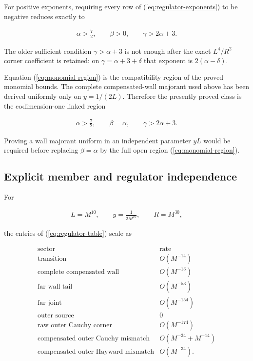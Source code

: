 For positive exponents, requiring every row of (\ref{eq:regulator-exponents}) to be negative reduces exactly to

\begin{align}
\alpha>\frac72,
\qquad
\beta>0,
\qquad
\gamma>2\alpha+3. \label{eq:monomial-region}
\end{align}

The older sufficient condition $\gamma>\alpha+3$ is not enough after the exact $L^4/R^2$ corner coefficient is retained: on $\gamma=\alpha+3+\delta$ that exponent is $2(\alpha-\delta)$.

Equation (\ref{eq:monomial-region}) is the compatibility region of the proved monomial bounds. The complete compensated-wall majorant used above has been derived uniformly only on $y=1/(2L)$. Therefore the presently proved class is the codimension-one linked region

\begin{align}
\boxed{
\alpha>\frac72,
\qquad
\beta=\alpha,
\qquad
\gamma>2\alpha+3 .
} \label{eq:proved-linked-region}
\end{align}

Proving a wall majorant uniform in an independent parameter $yL$ would be required before replacing $\beta=\alpha$ by the full open region (\ref{eq:monomial-region}).

\subsection{Explicit member and regulator independence}\label{subsec:regulator-independence}

For

\begin{align}
L=M^{10},
\qquad
y=\frac1{2M^{10}},
\qquad
R=M^{30},
\end{align}

the entries of (\ref{eq:regulator-table}) scale as

\[\begin{array}{c|c}
\text{sector} & \text{rate}\\ \hline
\text{transition} & O(M^{-14})\\
\text{complete compensated wall} & O(M^{-13})\\
\text{far wall tail} & O(M^{-53})\\
\text{far joint} & O(M^{-154})\\
\text{outer source} & 0\\
\text{raw outer Cauchy corner} & O(M^{-174})\\
\text{compensated outer Cauchy mismatch} & O(M^{-34}+M^{-14})\\
\text{compensated outer Hayward mismatch} & O(M^{-34}).
\end{array}
\]

